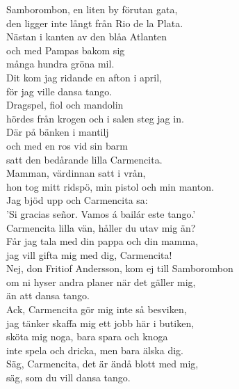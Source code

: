 \documentclass[a6paper, 10pt, twoside]{article}
\begin{document}
\noindent
\begin{center}
\end{center}
\begin{lyrics}
Samborombon, en liten by förutan gata, \\
den ligger inte långt från Rio de la Plata. \\
Nästan i kanten av den blåa Atlanten \\
och med Pampas bakom sig \\
många hundra gröna mil. \\
Dit kom jag ridande en afton i april, \\
för jag ville dansa tango. 
\vspace{5pt}\\
Dragspel, fiol och mandolin \\
hördes från krogen och i salen steg jag in. \\
Där på bänken i mantilj \\
och med en ros vid sin barm\\
satt den bedårande lilla Carmencita. \\
Mamman, värdinnan satt i vrån, \\
hon tog mitt ridspö, min pistol och min manton. \\
Jag bjöd upp och Carmencita sa: \\
'Si gracias señor. Vamos á bailár este tango.' 
\vspace{5pt}\\
Carmencita lilla vän, håller du utav mig än? \\
Får jag tala med din pappa och din mamma, \\
jag vill gifta mig med dig, Carmencita! \\
Nej, don Fritiof Andersson, kom ej till Samborombon \\
om ni hyser andra planer när det gäller mig, \\
än att dansa tango. 
\vspace{5pt}\\
Ack, Carmencita gör mig inte så besviken, \\
jag tänker skaffa mig ett jobb här i butiken, \\
sköta mig noga, bara spara och knoga \\
inte spela och dricka, men bara älska dig. \\
Säg, Carmencita, det är ändå blott med mig, \\
säg, som du vill dansa tango. 


\end{lyrics}
\end{document}
